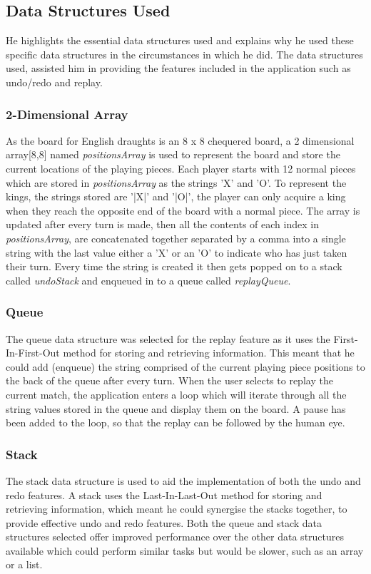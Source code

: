 \documentclass[10pt, a4paper]{article}
\begin{document}
 
 
 
 \subsection{Data Structures Used}
 He highlights the essential data structures used and explains why he used these specific data structures in the circumstances in which he did. The data structures used, assisted him in providing the features included in the application such as undo/redo and replay.     
 
 
 \subsubsection{2-Dimensional Array}   
 As the board for English draughts is an 8 x 8 chequered board, a 2 dimensional array[8,8] named \textit{positionsArray} is used to represent the board and store the current locations of the playing pieces. Each player starts with 12 normal pieces which are stored in \textit{positionsArray} as the strings 'X' and 'O'. To represent the kings, the strings stored are '|X|' and '|O|', the player can only acquire a king when they reach the opposite end of the board with a normal piece.
 The array is updated after every turn is made, then all the contents of each index in \textit{positionsArray}, are concatenated together separated by a comma into a single string with the last value either a 'X' or an 'O' to indicate who has just taken their turn. Every time the string is created it then gets popped on to a stack called \textit{undoStack} and enqueued in to a queue called \textit{replayQueue}.
 
 
 
 \subsubsection{Queue}
 The queue data structure was selected for the replay feature as it uses the First-In-First-Out method for storing and retrieving information. This meant that he could add (enqueue) the string comprised of the current playing piece positions to the back of the queue after every turn. When the user selects to replay the current match, the application enters a loop which will iterate through all the string values stored in the queue and display them on the board. A pause has been added to the loop, so that the replay can be followed by the human eye.
 
 
 \subsubsection{Stack}
 The stack data structure is used to aid the implementation of both the undo and redo features. A stack uses the Last-In-Last-Out method for storing and retrieving information, which meant he could synergise the stacks together, to provide effective undo and redo features.
 \newline
 Both the queue and stack data structures selected offer improved performance over the other data structures available which could perform similar tasks but would be slower, such as an array or a list.
 
\end{document}
